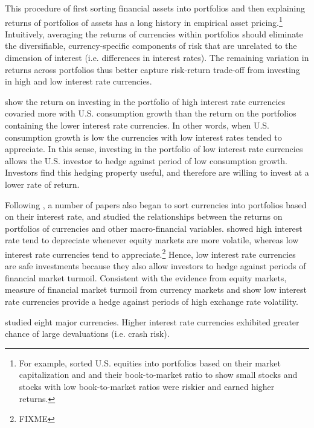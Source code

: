 \documentclass[12pt,letter]{article}
\theoremstyle{break} \theorembodyfont{\normalfont\itshape}
\theoremstyle{break}
\theoremstyle{break} \theorembodyfont{\normalfont\itshape}
\theoremstyle{break} \theorembodyfont{\normalfont\itshape}
\begin{document}
This procedure of first sorting financial assets into portfolios and then
explaining returns of portfolios of assets has a long history in empirical 
asset pricing.\footnote{For example, \citet{FamaFrench1992} sorted 
U.S. equities into portfolios based on their market capitalization and 
and their book-to-market ratio to show small stocks and stocks with low
book-to-market ratios were riskier and earned higher returns.} Intuitively, 
averaging the returns of currencies within portfolios should eliminate the
diversifiable, currency-specific components of risk that are unrelated
to the dimension of interest (i.e. differences in interest rates). The 
remaining variation in returns across portfolios thus better capture 
risk-return trade-off from investing in high and low interest rate 
currencies.

\citet{LustigVerdelhan2007} show the return on investing in the portfolio 
of high interest rate currencies covaried more with U.S. consumption growth 
than the return on the portfolios containing the lower interest rate currencies. 
In other words, when U.S. consumption growth is low the currencies with low 
interest rates tended to appreciate. In this sense, investing in the portfolio 
of low interest rate currencies allows the U.S. investor to hedge against period 
of low consumption growth. Investors find this hedging property useful, and 
therefore are willing to invest at a lower rate of return. 

Following \citet{LustigVerdelhan2007}, a number of papers also began to sort 
currencies into portfolios based on their interest rate, and studied the 
relationships between the returns on portfolios of currencies and other 
macro-financial variables.  
\citet{LustigRoussanovVerdelhan2011} showed high interest rate tend
to depreciate whenever equity markets are more volatile, whereas low
interest rate currencies tend to appreciate.\footnote{\citet{CampbellMeideirosViceira2010} FIXME} Hence, low interest rate
currencies are safe investments because they also allow investors to hedge
against periods of financial market turmoil. Consistent with the evidence
from equity markets, \citet{MenkhoffSarnoSchmelingSchrimpf2012} measure of 
financial market turmoil from currency markets and show low interest rate
currencies provide a hedge against periods of high exchange rate volatility. 


\citet{BrunnermeierNagelPedersen2008} studied eight major currencies. Higher 
interest rate currencies exhibited greater chance of large devaluations (i.e. crash risk).
\end{document}
